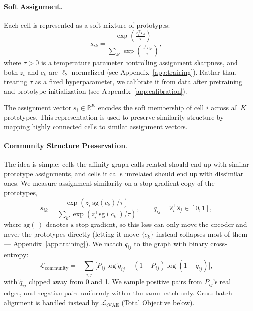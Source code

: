 \paragraph{Soft Assignment.}
Each cell is represented as a soft mixture of prototypes:
\begin{equation}
s_{ik} =
\frac{\exp\left( \frac{z_i^\top c_k}{\tau} \right)}
{\sum_{k'} \exp\left( \frac{z_i^\top c_{k'}}{\tau} \right)},
\end{equation}
where $\tau > 0$ is a temperature parameter controlling assignment sharpness, and both $z_i$ and $c_k$ are $\ell_2$-normalized (see Appendix~\ref{app:training}). Rather than treating $\tau$ as a fixed hyperparameter, we calibrate it from data after pretraining and prototype initialization (see Appendix~\ref{app:calibration}).

The assignment vector $s_i \in \mathbb{R}^K$ encodes the soft membership of cell $i$ across all $K$ prototypes. This representation is used to preserve similarity structure by mapping highly connected cells to similar assignment vectors.

\paragraph{Community Structure Preservation.}
The idea is simple: cells the affinity graph calls related should end up with similar prototype assignments, and cells it calls unrelated should end up with dissimilar ones. We measure assignment similarity on a stop-gradient copy of the prototypes,
\begin{equation}
\hat{s}_{ik} =
\frac{\exp\left( z_i^\top \mathrm{sg}(c_k) / \tau \right)}
{\sum_{k'} \exp\left( z_i^\top \mathrm{sg}(c_{k'}) / \tau \right)},
\qquad
q_{ij} = \hat{s}_i^\top \hat{s}_j \in [0,1],
\end{equation}
where $\mathrm{sg}(\cdot)$ denotes a stop-gradient, so this loss can only move the encoder and never the prototypes directly (letting it move $\{c_k\}$ instead collapses most of them --- Appendix~\ref{app:training}). We match $q_{ij}$ to the graph with binary cross-entropy:
\begin{equation}
\mathcal{L}_{\text{community}}
=
-\sum_{i,j}
\Big[
P_{ij}\log \tilde q_{ij}
+
(1-P_{ij})\log(1-\tilde q_{ij})
\Big],
\end{equation}
with $\tilde q_{ij}$ clipped away from 0 and 1. We sample positive pairs from $P_{ij}$'s real edges, and negative pairs uniformly within the same batch only. Cross-batch alignment is handled instead by $\mathcal{L}_{\text{cVAE}}$ (Total Objective below).

